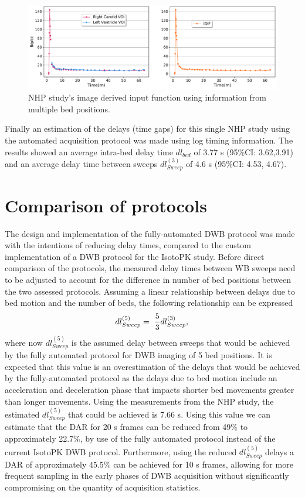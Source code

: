 %
%
\begin{figure} [ht!]
\centering
\includegraphics[scale=0.45,angle=0]{3_Results/3_1_DWB_Optimization/figures/3_1_NHP_InputFunction.pdf}
\caption{NHP study's image derived input function using information from multiple bed positions.}
\label{fig3_1:Macaque_PET_input_function}
\end{figure}
%
Finally an estimation of the delays (time gaps) for this single NHP study using the automated acquisition protocol was made using log timing information. The results showed an average intra-bed delay time $dl_{bed}$ of 3.77 s (95\%CI: 3.62,3.91) and an average delay time between sweeps $dl_{Sweep}^{(3)}$ of 4.6 s (95\%CI: 4.53, 4.67). 

\section{Comparison of protocols}
The design and implementation of the fully-automated DWB protocol was made with the intentions of reducing delay times, compared to the custom implementation of a DWB protocol for the IsotoPK study. 
Before direct comparison of the protocols, the measured delay times between WB sweeps need to be adjusted to account for the difference in number of bed positions between the two assessed protocols. 
Assuming a linear relationship between delays due to bed motion and the number of beds, the following relationship can be expressed
%
\begin{equation} \label{eqn:acq_to_dead_time_ratio}
dl_{{Sweep}}^{(5)} =\ \frac{5}{3} dl_{{Sweep}}^{(3)}  \\ , \\ 
\end{equation}
%
where now $dl_{Sweep}^{(5)}$ is the assumed delay between sweeps that would be achieved by the fully automated protocol for DWB imaging of 5 bed positions.
It is expected that this value is an overestimation of the delays that would be achieved by the fully-automated protocol as the delays due to bed motion include an acceleration and deceleration phase that impacts shorter bed movements greater than longer movements.
Using the measurements from the NHP study, the estimated $dl_{Sweep}^{(5)}$ that could be achieved is 7.66 s. 
Using this value we can estimate that the DAR for 20 s frames can be reduced from 49\% to approximately 22.7\%, by use of the fully automated protocol instead of the current IsotoPK DWB protocol. Furthermore, using the reduced $dl_{Sweep}^{(5)}$ delays a DAR of approximately 45.5\% can be achieved for 10 s frames, allowing for more frequent sampling in the early phases of DWB acquisition without significantly compromising on the quantity of acquisition statistics. 

